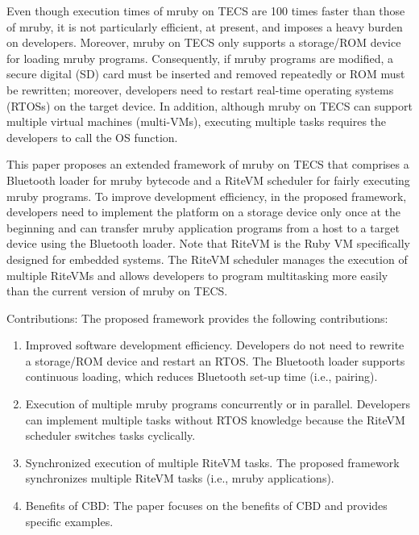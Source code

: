 \documentclass{sig-alternate-05-2015}
\begin{document}
Even though execution times of mruby on TECS are 100 times faster than those of mruby, it is not particularly efficient, at present, and imposes a heavy burden on developers.
Moreover, mruby on TECS only supports a storage/ROM device for loading mruby programs.
Consequently, if mruby programs are modified, a secure digital (SD) card must be inserted and removed repeatedly or ROM must be rewritten; moreover, developers need to restart real-time operating systems (RTOSs) on the target device.
In addition, although mruby on TECS can support multiple virtual machines (multi-VMs), executing multiple tasks requires the developers to call the OS function.

This paper proposes an extended framework of mruby on TECS that comprises a Bluetooth loader for mruby bytecode and a RiteVM scheduler for fairly executing mruby programs.
To improve development efficiency, in the proposed framework, developers need to implement the platform on a storage device only once at the beginning and can transfer mruby application programs from a host to a target device using the Bluetooth loader.
Note that RiteVM is the Ruby VM specifically designed for embedded systems.
The RiteVM scheduler manages the execution of multiple RiteVMs and allows developers to program multitasking more easily than the current version of mruby on TECS.

{\mybf Contributions}: The proposed framework provides the following contributions:
\begin{enumerate}
\item {\mybf Improved software development efficiency.}
Developers do not need to rewrite a storage/ROM device and restart an RTOS.
The Bluetooth loader supports continuous loading, which reduces Bluetooth set-up time (i.e., pairing).
\item {\mybf Execution of multiple mruby programs concurrently or in parallel.}
Developers can implement multiple tasks without RTOS knowledge because the RiteVM scheduler switches tasks cyclically.
\item {\mybf Synchronized execution of multiple RiteVM tasks.}
The proposed framework synchronizes multiple RiteVM tasks (i.e., mruby applications).
\item {\mybf Benefits of CBD:}
The paper focuses on the benefits of CBD and provides specific examples.
\end{enumerate}
\end{document}
